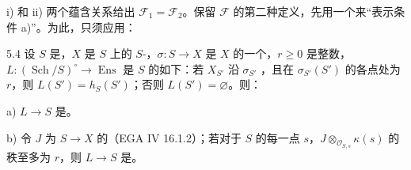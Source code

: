 i) 和 ii) 两个蕴含关系给出 $\mathscr F_1=\mathscr F_2$。保留 $\mathscr F$ 的第二种定义，先用一个来“表示条件 a)”。为此，只须应用：
\begin{SGAresult}{}{5.4}
设 $S$ 是，$X$ 是 $S$ 上的 $S$-，$\sigma:S\to X$ 是 $X$ 的一个，$r\geq0$ 是整数，$L:(\operatorname{Sch}/S)^{\circ}\to\operatorname{Ens}$ 是 $S$ 的如下：若 $X_{S'}$ 沿 $\sigma_{S'}$ ，且在 $\sigma_{S'}(S')$ 的各点处为 $r$，则 $L(S')=h_S(S')$；否则 $L(S')=\varnothing$。则：

a)  $L\to S$ 是。

b) 令 $J$ 为 $S\to X$ 的（EGA IV 16.1.2）；若对于 $S$ 的每一点 $s$，$J\otimes_{\mathcal O_{S,s}}\kappa(s)$ 的秩至多为 $r$，则 $L\to S$ 是。
\end{SGAresult}
